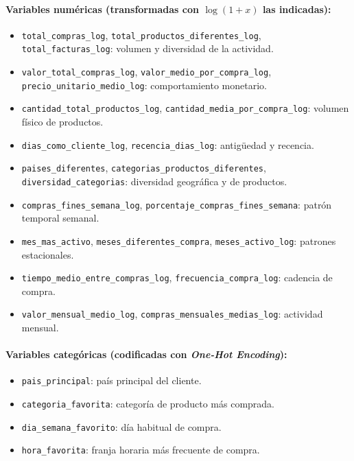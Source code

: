\documentclass[11pt,a4paper]{article}
\begin{document}
\paragraph{Variables numéricas (transformadas con $\log(1+x)$ las indicadas):}
\begin{itemize}
    \item \texttt{total\_compras\_log}, \texttt{total\_productos\_diferentes\_log}, \texttt{total\_facturas\_log}: volumen y diversidad de la actividad.
    \item \texttt{valor\_total\_compras\_log}, \texttt{valor\_medio\_por\_compra\_log}, \texttt{precio\_unitario\_medio\_log}: comportamiento monetario.
    \item \texttt{cantidad\_total\_productos\_log}, \texttt{cantidad\_media\_por\_compra\_log}: volumen físico de productos.
    \item \texttt{dias\_como\_cliente\_log}, \texttt{recencia\_dias\_log}: antigüedad y recencia.
    \item \texttt{paises\_diferentes}, \texttt{categorias\_productos\_diferentes}, \texttt{diversidad\_categorias}: diversidad geográfica y de productos.
    \item \texttt{compras\_fines\_semana\_log}, \texttt{porcentaje\_compras\_fines\_semana}: patrón temporal semanal.
    \item \texttt{mes\_mas\_activo}, \texttt{meses\_diferentes\_compra}, \texttt{meses\_activo\_log}: patrones estacionales.
    \item \texttt{tiempo\_medio\_entre\_compras\_log}, \texttt{frecuencia\_compra\_log}: cadencia de compra.
    \item \texttt{valor\_mensual\_medio\_log}, \texttt{compras\_mensuales\_medias\_log}: actividad mensual.
\end{itemize}

\paragraph{Variables categóricas (codificadas con \textit{One-Hot Encoding}):}
\begin{itemize}
    \item \texttt{pais\_principal}: país principal del cliente.
    \item \texttt{categoria\_favorita}: categoría de producto más comprada.
    \item \texttt{dia\_semana\_favorito}: día habitual de compra.
    \item \texttt{hora\_favorita}: franja horaria más frecuente de compra.
\end{itemize}
\end{document}

